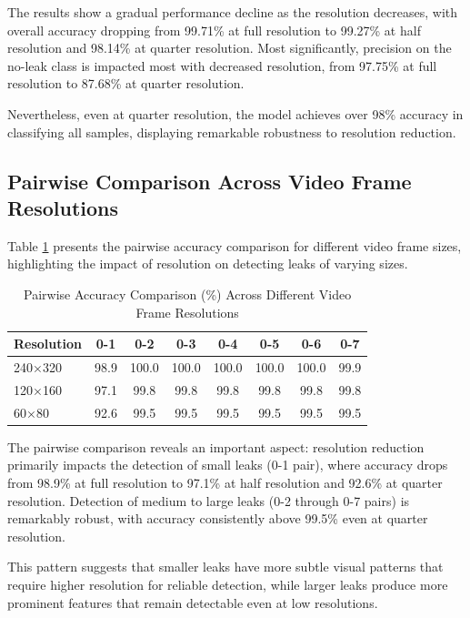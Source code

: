 The results show a gradual performance decline as the resolution decreases, with overall accuracy dropping from 99.71\% at full resolution to 99.27\% at half resolution and 98.14\% at quarter resolution. Most significantly, precision on the no-leak class is impacted most with decreased resolution, from 97.75\% at full resolution to 87.68\% at quarter resolution.

Nevertheless, even at quarter resolution, the model achieves over 98\% accuracy in classifying all samples, displaying remarkable robustness to resolution reduction.

\subsection{Pairwise Comparison Across Video Frame Resolutions}

Table \ref{tab:pairwise_resolution} presents the pairwise accuracy comparison for different video frame sizes, highlighting the impact of resolution on detecting leaks of varying sizes.

\begin{table}[htbp]
\caption{Pairwise Accuracy Comparison (\%) Across Different Video Frame Resolutions}
\label{tab:pairwise_resolution}
\begin{tabular}{|l|c|c|c|c|c|c|c|}
\hline
\textbf{Resolution} & \textbf{0-1} & \textbf{0-2} & \textbf{0-3} & \textbf{0-4} & \textbf{0-5} & \textbf{0-6} & \textbf{0-7} \\
\hline
240×320 & 98.9 & 100.0 & 100.0 & 100.0 & 100.0 & 100.0 & 99.9 \\
\hline
120×160 & 97.1 & 99.8 & 99.8 & 99.8 & 99.8 & 99.8 & 99.8 \\
\hline
60×80 & 92.6 & 99.5 & 99.5 & 99.5 & 99.5 & 99.5 & 99.5 \\
\hline
\end{tabular}
\end{table}

The pairwise comparison reveals an important aspect: resolution reduction primarily impacts the detection of small leaks (0-1 pair), where accuracy drops from 98.9\% at full resolution to 97.1\% at half resolution and 92.6\% at quarter resolution. Detection of medium to large leaks (0-2 through 0-7 pairs) is remarkably robust, with accuracy consistently above 99.5\% even at quarter resolution.

This pattern suggests that smaller leaks have more subtle visual patterns that require higher resolution for reliable detection, while larger leaks produce more prominent features that remain detectable even at low resolutions.

